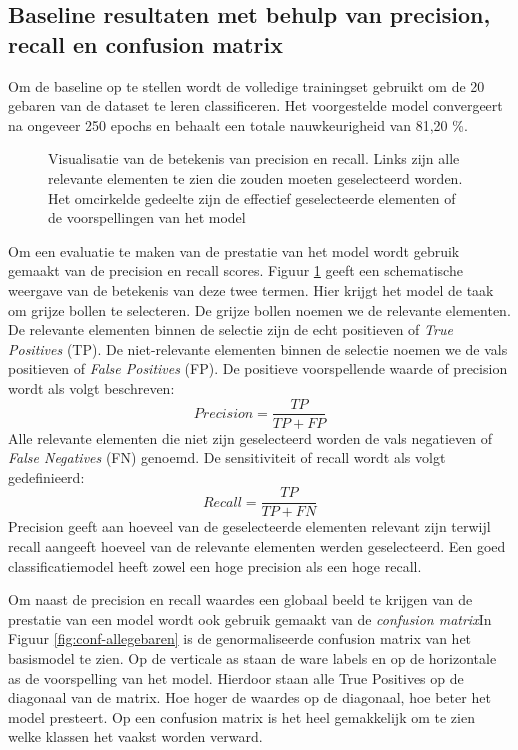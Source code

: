 \subsection{Baseline resultaten met behulp van precision, recall en confusion matrix}
Om de baseline op te stellen wordt de volledige trainingset gebruikt om de 20 gebaren van de dataset te leren classificeren. Het voorgestelde model convergeert na ongeveer 250 epochs en behaalt een totale nauwkeurigheid van 81,20 \%.

\begin{figure}[!t]
	\centering
	\def\svgwidth{0.7\columnwidth}
	
	\caption{Visualisatie van de betekenis van precision en recall. Links zijn alle relevante elementen te zien die zouden moeten geselecteerd worden. Het omcirkelde gedeelte zijn de effectief geselecteerde elementen of de voorspellingen van het model}
	\label{fig:prec+recall}
\end{figure}
Om een evaluatie te maken van de prestatie van het model wordt gebruik gemaakt van de precision en recall scores. Figuur \ref{fig:prec+recall} geeft een schematische weergave van de betekenis van deze twee termen. Hier krijgt het model de taak om grijze bollen te selecteren. De grijze bollen noemen we de relevante elementen. De relevante elementen binnen de selectie zijn de echt positieven of \textit{True Positives} (TP). De niet-relevante elementen binnen de selectie noemen we de vals positieven of \textit{False Positives} (FP). De positieve voorspellende waarde of precision wordt als volgt beschreven:
\begin{equation}
Precision = \frac{TP}{TP+FP}
\end{equation}
Alle relevante elementen die niet zijn geselecteerd worden de vals negatieven of \textit{False Negatives} (FN) genoemd. De sensitiviteit of recall wordt als volgt gedefinieerd:
\begin{equation}
Recall = \frac{TP}{TP+FN}
\end{equation}
Precision geeft aan hoeveel van de geselecteerde elementen relevant zijn terwijl recall aangeeft hoeveel van de relevante elementen werden geselecteerd. Een goed classificatiemodel heeft zowel een hoge precision als een hoge recall.

\npar Om naast de precision en recall waardes een globaal beeld te krijgen van de prestatie van een model wordt ook gebruik gemaakt van de \textit{confusion matrix}In Figuur \ref{fig:conf-allegebaren} is de genormaliseerde confusion matrix van het basismodel te zien. Op de verticale as staan de ware labels en op de horizontale as de voorspelling van het model. Hierdoor staan alle True Positives op de diagonaal van de matrix. Hoe hoger de waardes op de diagonaal, hoe beter het model presteert. Op een confusion matrix is het heel gemakkelijk om te zien welke klassen het vaakst worden verward.

